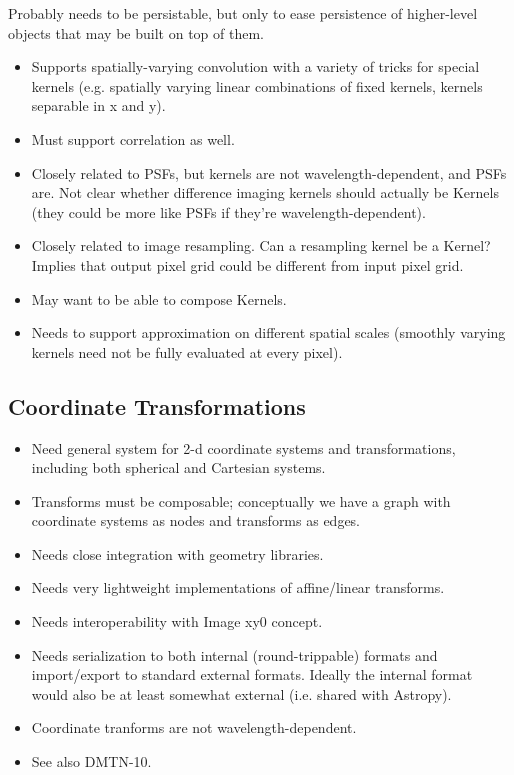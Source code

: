 Probably needs to be persistable, but only to ease persistence of higher-level objects that may be built on top of them.

\begin{itemize}
\item Supports spatially-varying convolution with a variety of tricks for special kernels (e.g. spatially varying linear combinations of fixed kernels, kernels separable in x and y).
\item Must support correlation as well.
\item Closely related to PSFs, but kernels are not wavelength-dependent, and PSFs are.  Not clear whether difference imaging kernels should actually be Kernels (they could be more like PSFs if they're wavelength-dependent).
\item Closely related to image resampling.  Can a resampling kernel be a Kernel?  Implies that output pixel grid could be different from input pixel grid.
\item May want to be able to compose Kernels.
\item Needs to support approximation on different spatial scales (smoothly varying kernels need not be fully evaluated at every pixel).
\end{itemize}

\subsection{Coordinate Transformations}
\label{sec:spWCS}

\begin{itemize}
\item Need general system for 2-d coordinate systems and transformations, including both spherical and Cartesian systems.
\item Transforms must be composable; conceptually we have a graph with coordinate systems as nodes and transforms as edges.
\item Needs close integration with geometry libraries.
\item Needs very lightweight implementations of affine/linear transforms.
\item Needs interoperability with Image xy0 concept.
\item Needs serialization to both internal (round-trippable) formats and import/export to standard external formats.  Ideally the internal format would also be at least somewhat external (i.e. shared with Astropy).
\item Coordinate tranforms are not wavelength-dependent.
\item See also DMTN-10.
\end{itemize}


